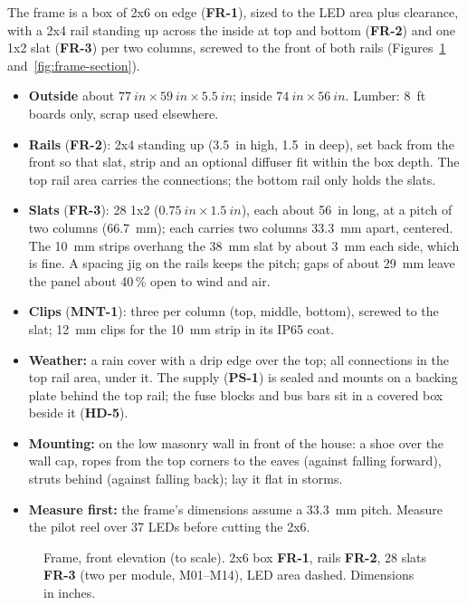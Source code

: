 \documentclass[11pt,letterpaper]{article}
\newcommand{\id}[1]{\textsf{\textbf{#1}}}  %
\begin{document}
The frame is a box of 2x6 on edge (\id{FR-1}), sized to the LED area plus clearance, with a 2x4 rail
standing up across the inside at top and bottom (\id{FR-2}) and one 1x2 slat (\id{FR-3}) per two columns,
screwed to the front of both rails (Figures~\ref{fig:frame-front} and~\ref{fig:frame-section}).
\begin{itemize}
  \item \textbf{Outside} about $\SI{77}{in} \times \SI{59}{in} \times \SI{5.5}{in}$; inside
    $\SI{74}{in} \times \SI{56}{in}$.  Lumber: 8~ft boards only, scrap used elsewhere.
  \item \textbf{Rails} (\id{FR-2}): 2x4 standing up (\SI{3.5}{in} high, \SI{1.5}{in} deep), set back from the
    front so that slat, strip and an optional diffuser fit within the box depth.  The top rail area carries
    the connections; the bottom rail only holds the slats.
  \item \textbf{Slats} (\id{FR-3}): 28 1x2 ($\SI{0.75}{in} \times \SI{1.5}{in}$), each about \SI{56}{in} long,
    at a pitch of two columns (\SI{66.7}{mm}); each carries two columns \SI{33.3}{mm} apart, centered.  The
    \SI{10}{mm} strips overhang the \SI{38}{mm} slat by about \SI{3}{mm} each side, which is fine.  A spacing jig
    on the rails keeps the pitch; gaps of about \SI{29}{mm} leave the panel about 40\,\% open to wind and air.
  \item \textbf{Clips} (\id{MNT-1}): three per column (top, middle, bottom), screwed to the slat; 12~mm clips for
    the 10~mm strip in its IP65 coat.
  \item \textbf{Weather:} a rain cover with a drip edge over the top; all connections in the top rail area,
    under it.  The supply (\id{PS-1}) is sealed and mounts on a backing plate behind the top rail; the fuse
    blocks and bus bars sit in a covered box beside it (\id{HD-5}).
  \item \textbf{Mounting:} on the low masonry wall in front of the house: a shoe over the wall cap, ropes from
    the top corners to the eaves (against falling forward), struts behind (against falling back); lay it flat
    in storms.
  \item \textbf{Measure first:} the frame's dimensions assume a \SI{33.3}{mm} pitch.  Measure the pilot reel
    over 37 LEDs before cutting the 2x6.
\end{itemize}

\begin{figure}[!htbp]
  \centering
  
  \caption{Frame, front elevation (to scale).  2x6 box \id{FR-1}, rails \id{FR-2}, 28 slats \id{FR-3} (two per
    module, M01--M14), LED area dashed.  Dimensions in inches.}
  \label{fig:frame-front}
\end{figure}
\end{document}
